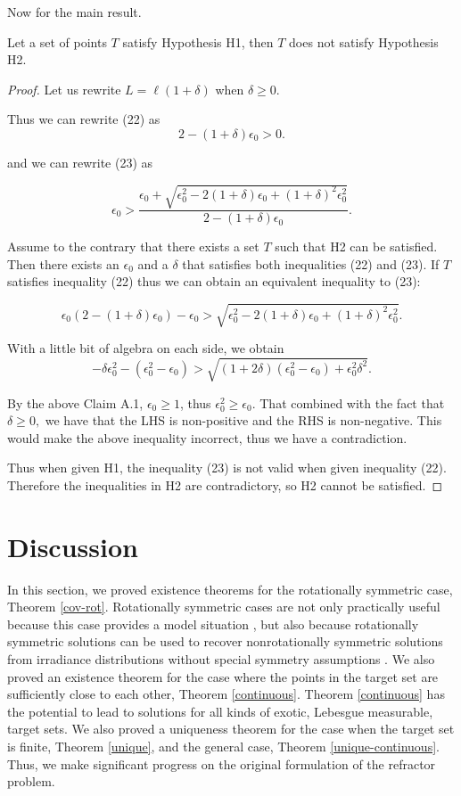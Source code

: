 \documentclass[review]{elsarticle}
\newcounter{cases}
\begin{document}
Now for the main result.

\begin{theorem}
Let a set of points $T$ satisfy Hypothesis H1, then $T$ does not satisfy Hypothesis H2.
\end{theorem}

\begin{proof}
Let us rewrite $L=\ell(1+\delta)$ when $\delta\ge 0$.

Thus we can rewrite (22) as
\[2-(1+\delta)\epsilon_0>0.\]

and we can rewrite (23) as 

\[\epsilon_0>\frac{ \epsilon_0 +\sqrt{\epsilon_0^2-2(1+\delta) \epsilon_0 + (1+\delta)^2\epsilon_0^2}}{2 -(1+\delta)\epsilon_0}.\]

 Assume to the contrary that there exists a set $T$ such that H2 can be satisfied. Then there exists an $\epsilon_0$ and a $\delta$ that satisfies both inequalities (22) and (23).
If $T$ satisfies inequality (22) thus we can obtain an equivalent inequality to (23):

\[\epsilon_0(2 -(1+\delta)\epsilon_0)-\epsilon_0>\sqrt{\epsilon_0^2-2(1+\delta) \epsilon_0 + (1+\delta)^2\epsilon_0^2}.\]

With a little bit of algebra on each side, we obtain
\[-\delta\epsilon_0^2-(\epsilon_0^2-\epsilon_0)>\sqrt{(1+2\delta)(\epsilon_0^2-\epsilon_0)+\epsilon_0^2\delta^2}.\]

By the above Claim A.1, $\epsilon_0\ge1$, thus $\epsilon_0^2\ge\epsilon_0$. That combined with the fact that $\delta\ge0,$ we have that the LHS is non-positive and the RHS is non-negative. This would make the above inequality incorrect, thus we have a contradiction.

Thus when given H1, the inequality (23) is not valid when given inequality (22). Therefore the inequalities in H2 are contradictory, so H2 cannot be satisfied.
\end{proof}



\section{Discussion}

In this section, we proved existence theorems for the rotationally symmetric case, Theorem \ref{cov-rot}. Rotationally symmetric cases are not only practically useful because this case provides a model situation \cite{Oliker_1989}, but also because rotationally symmetric solutions can be used to recover nonrotationally symmetric solutions from irradiance distributions without special symmetry assumptions \cite{Oliker1987NearRS}. We also proved an existence theorem for the case where the points in the target set are sufficiently close to each other, Theorem \ref{continuous}. Theorem \ref{continuous} has the potential to lead to solutions for all kinds of exotic, Lebesgue measurable, target sets. We also proved a uniqueness theorem for the case when the target set is finite, Theorem \ref{unique}, and the general case, Theorem \ref{unique-continuous}. Thus, we make significant progress on the original formulation of the refractor problem.
\end{document}
